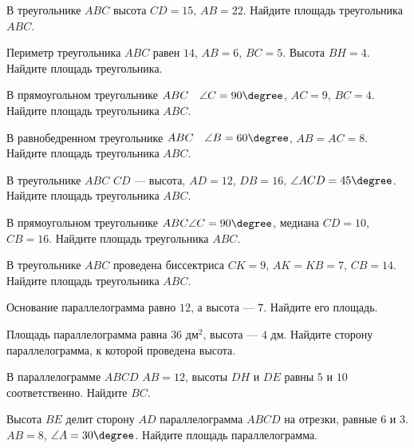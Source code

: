 \begin{class}[number=4]
	\begin{listofex}
		\item В треугольнике \( ABC \) высота \( CD=15 \), \( AB=22 \). Найдите площадь треугольника \( ABC \).
		\item Периметр треугольника \( ABC \) равен \( 14 \), \( AB=6 \), \( BC=5 \). Высота \( BH=4 \). Найдите площадь треугольника.
		\item В прямоугольном треугольнике \( ABC \quad \angle C=90\degree\), \( AC=9 \), \( BC=4 \). Найдите площадь треугольника \( ABC \).
		\item В равнобедренном треугольнике \( ABC \quad \angle B=60\degree \), \( AB=AC=8 \). Найдите площадь треугольника \( ABC \).
		\item В треугольнике \( ABC \) \( CD \) --- высота, \( AD=12 \), \( DB=16 \), \( \angle ACD=45\degree \). Найдите площадь треугольника \( ABC \).
		\item В прямоугольном треугольнике \( ABC  \angle C=90\degree\), медиана \( CD=10 \), \( CB=16 \). Найдите площадь треугольника \( ABC \).
		\item В треугольнике \( ABC \) проведена биссектриса \( CK=9 \), \( AK=KB=7 \), \( CB=14 \). Найдите площадь треугольника \( ABC \).
		\item Основание параллелограмма равно \( 12 \), а высота --- \( 7 \). Найдите его площадь.
		\item Площадь параллелограмма равна \( 36 \) дм\( ^2 \), высота --- \( 4 \) дм. Найдите сторону параллелограмма, к которой проведена высота.
		\item В параллелограмме \( ABCD \) \( AB=12 \), высоты \( DH \) и \( DE \) равны \( 5 \) и \( 10 \) соответственно. Найдите \( BC \).
		\item Высота \( BE \) делит сторону \( AD \) параллелограмма \( ABCD \) на отрезки, равные \( 6 \) и \( 3 \). \( AB=8 \), \( \angle A=30\degree \). Найдите площадь параллелограмма.
	\end{listofex}
\end{class}

